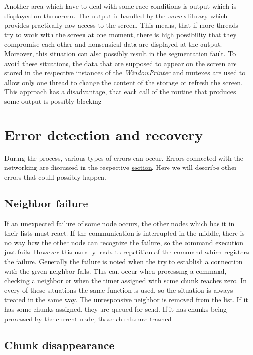 Another area which have to deal with some race conditions is output
which is displayed on the screen. The output is handled by the
\textit{curses} library which provides practically raw access to the
screen. This means, that if more threads try to work with the screen at
one moment, there is high possibility that they compromise each other
and nonsensical data are displayed at the output. Moreover, this
situation can also possibly result in the segmentation fault. To avoid
these situations, the data that are supposed to appear on the screen are
stored in the respective instances of the \textit{WindowPrinter} and
mutexes are used to allow only one thread to change the content of the
storage or refresh the screen. This approach has a disadvantage, that
each call of the routine that produces some output is possibly blocking

\section{Error detection and
recovery}\label{error-detection-and-recovery}

During the process, various types of errors can occur. Errors connected
with the networking are discussed in the respective
\hyperref[handling-errors]{section}. Here we will describe other errors
that could possibly happen.

\subsection*{Neighbor failure}

If an unexpected failure of some node occurs, the other nodes which has
it in their lists must react. If the communication is interrupted in the
middle, there is no way how the other node can recognize the failure, so
the command execution just fails. However this usually leads to
repetition of the command which registers the failure. Generally the
failure is noted when the try to establish a connection with the given
neighbor fails. This can occur when processing a command, checking a
neighbor or when the timer assigned with some chunk reaches zero. In
every of these situations the same function is used, so the situation is
always treated in the same way. The unresponsive neighbor is removed
from the list. If it has some chunks assigned, they are queued for send.
If it has chunks being processed by the current node, those chunks are
trashed.

\subsection*{Chunk disappearance}

